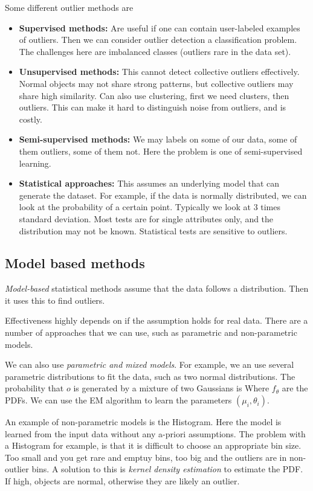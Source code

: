 Some different outlier methods are 
\begin{itemize}
    \item \textbf{Supervised methods:} Are useful if one can contain user-labeled examples of outliers. Then we can consider outlier detection a classification problem. The challenges here are imbalanced classes (outliers rare in the data set). 
    \item \textbf{Unsupervised methods:} This cannot detect collective outliers effectively. Normal objects may not share strong patterns, but collective outliers may share high similarity. Can also use clustering, first we need clusters, then outliers. This can make it hard to distinguish noise from outliers, and is costly.
    \item \textbf{Semi-supervised methods:} We may labels on some of our data, some of them outliers, some of them not. Here the problem is one of semi-supervised learning.
    \item \textbf{Statistical approaches:} This assumes an underlying model that can generate the dataset. For example, if the data is normally distributed, we can look at the probability of a certain point. Typically we look at $3$ times standard deviation. Most tests are for single attributes only, and the distribution may not be known. Statistical tests are sensitive to outliers.
\end{itemize}

\subsection{Model based methods}
    \emph{Model-based} statistical methods assume that the data follows a distribution. Then it uses this to find outliers. 
    
    Effectiveness highly depends on if the assumption holds for real data. There are a number of approaches that we can use, such as parametric and non-parametric models. 
    
    We can also use \emph{parametric and mixed models}. For example, we an use several parametric distributions to fit the data, such as two normal distributions. The probability that $o$ is generated by a mixture of two Gaussians is
    Where $f_\theta$ are the PDFs. We can use the EM algorithm to learn the parameters $(\mu_i, \theta_i)$. 
    
    An example of non-parametric models is the Histogram. Here the model is learned from the input data without any a-priori assumptions. The problem with a Histogram for example, is that it is difficult to choose an appropriate bin size. Too small and you get rare and emptuy bins, too big and the outliers are in non-outlier bins. A solution to this is \emph{kernel density estimation} to estimate the PDF. If high, objects are normal, otherwise they are likely an outlier.
    


